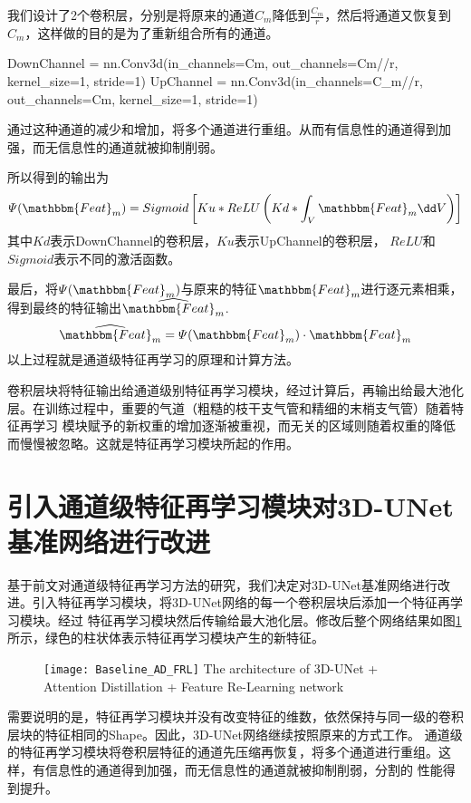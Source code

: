 我们设计了2个卷积层，分别是将原来的通道$C_m$降低到$\frac{C_m}{r}$，然后将通道又恢复到$C_m$，这样做的目的是为了重新组合所有的通道。
\begin{codeblock}[language=Python]
DownChannel = nn.Conv3d(in_channels=Cm, out_channels=Cm//r, kernel_size=1, stride=1)
UpChannel = nn.Conv3d(in_channels=C_m//r, out_channels=Cm, kernel_size=1, stride=1)
\end{codeblock}
通过这种通道的减少和增加，将多个通道进行重组。从而有信息性的通道得到加强，而无信息性的通道就被抑制削弱。

所以得到的输出为
\begin{equation}
    \varPsi(\mathbbm{Feat}_m) = {Sigmoid}\left[Ku * {ReLU}\left(Kd * \int_{V}\mathbbm{Feat}_m \dd V\right)\right]
\end{equation}
其中$Kd$表示DownChannel的卷积层，$Ku$表示UpChannel的卷积层， $ReLU$和$Sigmoid$表示不同的激活函数。

最后，将$\varPsi(\mathbbm{Feat}_m)$与原来的特征$\mathbbm{Feat}_m$进行逐元素相乘，得到最终的特征输出$\widehat{\mathbbm{Feat}_m}$.
\begin{equation}\label{eq:features_element_wise_multiply}
    \widehat{\mathbbm{Feat}_m} = \varPsi(\mathbbm{Feat}_m) \cdot \mathbbm{Feat}_m
\end{equation}
以上过程就是通道级特征再学习的原理和计算方法。

卷积层块将特征输出给通道级别特征再学习模块，经过计算后，再输出给最大池化层。在训练过程中，重要的气道（粗糙的枝干支气管和精细的末梢支气管）随着特征再学习
模块赋予的新权重的增加逐渐被重视，而无关的区域则随着权重的降低而慢慢被忽略。这就是特征再学习模块所起的作用。

\section{引入通道级特征再学习模块对3D-UNet基准网络进行改进}

基于前文对通道级特征再学习方法的研究，我们决定对3D-UNet基准网络进行改进。引入特征再学习模块，将3D-UNet网络的每一个卷积层块后添加一个特征再学习模块。经过
特征再学习模块然后传输给最大池化层。修改后整个网络结果如图\ref{fig:3dunet_ad_fr}所示，绿色的柱状体表示特征再学习模块产生的新特征。
\begin{figure}[!htp]
    \centering
    \texttt{[image: Baseline\_AD\_FRL]}
        {The architecture of 3D-UNet + Attention Distillation + Feature Re-Learning network}
    \label{fig:3dunet_ad_fr}
\end{figure}
需要说明的是，特征再学习模块并没有改变特征的维数，依然保持与同一级的卷积层块的特征相同的Shape。因此，3D-UNet网络继续按照原来的方式工作。
通道级的特征再学习模块将卷积层特征的通道先压缩再恢复，将多个通道进行重组。这样，有信息性的通道得到加强，而无信息性的通道就被抑制削弱，分割的
性能得到提升。

